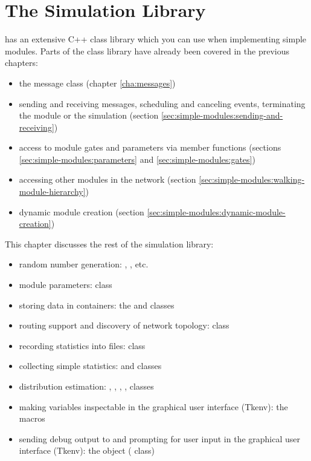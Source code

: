 \chapter{The Simulation Library}
\label{cha:the-simulation-library}

{\opp} has an extensive C++ class library which you can use when implementing
simple modules. Parts of the class library have already been covered in the
previous chapters:

\begin{itemize}
  \item{the message class  (chapter \ref{cha:messages})}
  \item{sending and receiving messages, scheduling and canceling
    events, terminating the module or the simulation
    (section \ref{sec:simple-modules:sending-and-receiving})}
  \item{access to module gates and parameters via  member functions
    (sections \ref{sec:simple-modules:parameters} and \ref{sec:simple-modules:gates})}
  \item{accessing other modules in the network (section \ref{sec:simple-modules:walking-module-hierarchy})}
  \item{dynamic module creation (section \ref{sec:simple-modules:dynamic-module-creation})}
\end{itemize}

This chapter discusses the rest of the simulation library:

\begin{itemize}
  \item{random number generation: ,
    , etc.}
  \item{module parameters:  class}
  \item{storing data in containers: the  and  classes}
  \item{routing support and discovery of network topology:  class}
  \item{recording statistics into files:  class}
  \item{collecting simple statistics:  and  classes}
  \item{distribution estimation: ,
    , , ,
     classes}
  \item{making variables inspectable in the graphical user interface (Tkenv):
        the  macros}
  \item{sending debug output to and prompting for user input in the graphical
    user interface (Tkenv): the  object ( class)}
\end{itemize}





